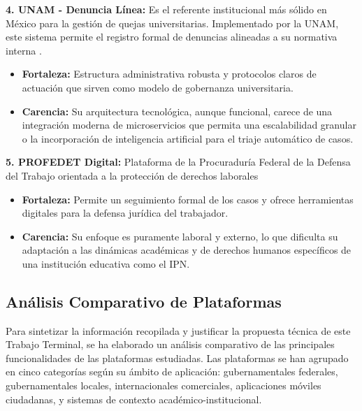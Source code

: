 \begin{flushleft}
\textbf{4. UNAM - Denuncia Línea:}
Es el referente institucional más sólido en México para la gestión de quejas universitarias. Implementado por la UNAM, este sistema permite el registro formal de denuncias alineadas a su normativa interna \cite{24}.
\begin{itemize}
    \item \textbf{Fortaleza:} Estructura administrativa robusta y protocolos claros de actuación que sirven como modelo de gobernanza universitaria.
    \item \textbf{Carencia:} Su arquitectura tecnológica, aunque funcional, carece de una integración moderna de microservicios que permita una escalabilidad granular o la incorporación de inteligencia artificial para el triaje automático de casos.
\end{itemize}

\textbf{5. PROFEDET Digital:}
Plataforma de la Procuraduría Federal de la Defensa del Trabajo orientada a la protección de derechos laborales \cite{25}
\begin{itemize}
    \item \textbf{Fortaleza:} Permite un seguimiento formal de los casos y ofrece herramientas digitales para la defensa jurídica del trabajador.
    \item \textbf{Carencia:} Su enfoque es puramente laboral y externo, lo que dificulta su adaptación a las dinámicas académicas y de derechos humanos específicos de una institución educativa como el IPN.
\end{itemize}
\end{flushleft}

\subsection{Análisis Comparativo de Plataformas}

\begin{flushleft}
\justifying
Para sintetizar la información recopilada y justificar la propuesta técnica de este Trabajo Terminal, se ha elaborado un análisis comparativo de las principales funcionalidades de las plataformas estudiadas. Las plataformas se han agrupado en cinco categorías según su ámbito de aplicación: gubernamentales federales, gubernamentales locales, internacionales comerciales, aplicaciones móviles ciudadanas, y sistemas de contexto académico-institucional.
\end{flushleft}


